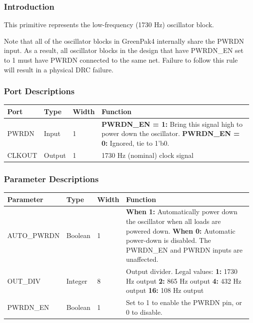 \documentclass{article}
\begin{document}
\subsubsection{Introduction}
This primitive represents the low-frequency (1730 Hz) oscillator block.

Note that all of the oscillator blocks in GreenPak4 internally share the PWRDN input. As a result, all oscillator 
blocks in the design that have PWRDN\_EN set to 1 must have PWRDN connected to the same net. Failure to follow this 
rule will result in a physical DRC failure.

\subsubsection{Port Descriptions}

\begin{tabularx}{5in}{|l|l|l|X|}
\hline
{\bfseries Port} & {\bfseries Type} & {\bfseries Width} & {\bfseries Function} \\
\hline
PWRDN & Input & 1 &
	{\bfseries PWRDN\_EN = 1:} \newline Bring this signal high to power down the oscillator. \newline
	{\bfseries PWRDN\_EN = 0:} \newline Ignored, tie to 1'b0.\\
\hline
CLKOUT & Output & 1 & 1730 Hz (nominal) clock signal \\
\hline
\end{tabularx}

\subsubsection{Parameter Descriptions}

\begin{tabularx}{5in}{|l|l|l|X|}
\hline
{\bfseries Parameter} & {\bfseries Type} & {\bfseries Width} & {\bfseries Function} \\
\hline
AUTO\_PWRDN & Boolean & 1 & 
	{\bfseries When 1: } \newline Automatically power down the oscillator when all loads are powered down. \newline
	{\bfseries When 0: } \newline Automatic power-down is disabled. The PWRDN\_EN and PWRDN inputs are unaffected.\\
\hline
OUT\_DIV & Integer & 8 &
	Output divider. Legal values: \newline
	{\bfseries 1:} 1730 Hz output \newline
	{\bfseries 2:} 865 Hz output \newline
	{\bfseries 4:} 432 Hz output \newline
	{\bfseries 16:} 108 Hz output
\\
\hline
PWRDN\_EN & Boolean & 1 & Set to 1 to enable the PWRDN pin, or 0 to disable. \\
\hline
\end{tabularx}
\end{document}
